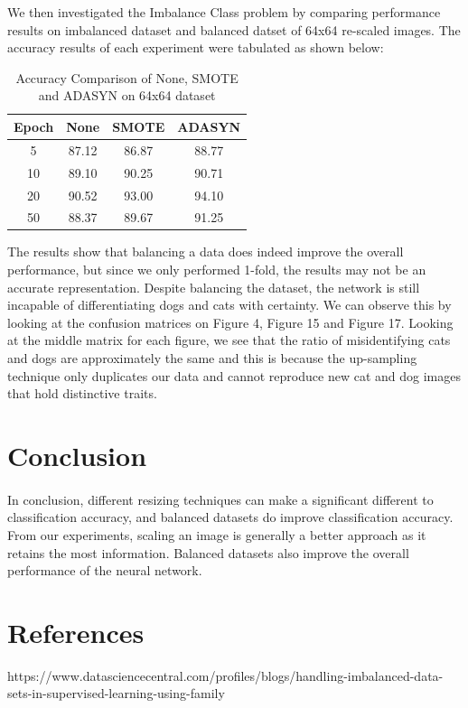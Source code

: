 \documentclass{article}
\begin{document}
We then investigated the Imbalance Class problem by comparing performance results on imbalanced dataset and balanced datset of 64x64 re-scaled images. The accuracy results of each experiment were tabulated as shown below:
\begin{table}[ht]
	\caption{Accuracy Comparison of None, SMOTE and ADASYN on 64x64 dataset} %
	\centering %
	\begin{tabular}{c c c c} %
		\hline\hline %
		
		Epoch &  None & SMOTE & ADASYN\\
		\hline

		\hline %
		5  &  87.12 & 86.87 & 88.77\\
		10 &  89.10 & 90.25 & 90.71\\
		20 &  90.52 & 93.00 & 94.10\\
		50 &  88.37 & 89.67 & 91.25\\ [1ex] %
		\hline %
	\end{tabular}
	\label{table:balanced} %
\end{table} 

The results show that balancing a data does indeed improve the overall performance, but since we only performed 1-fold, the results may not be an accurate representation. Despite balancing the dataset, the network is still incapable of differentiating dogs and cats with certainty. We can observe this by looking at the confusion matrices on Figure 4, Figure 15 and Figure 17. Looking at the middle matrix for each figure, we see that the ratio of misidentifying cats and dogs are approximately the same and this is because the up-sampling technique only duplicates our data and cannot reproduce new cat and dog images that hold distinctive traits. 

\section{Conclusion	}
\paragraph{}
In conclusion, different resizing techniques can make a significant different to classification accuracy, and balanced datasets do improve classification accuracy. From our experiments, scaling an image is generally a better approach as it retains the most information. Balanced datasets also improve the overall performance of the neural network. 
\section{References	}
https://www.datasciencecentral.com/profiles/blogs/handling-imbalanced-data-sets-in-supervised-learning-using-family
\end{document}
